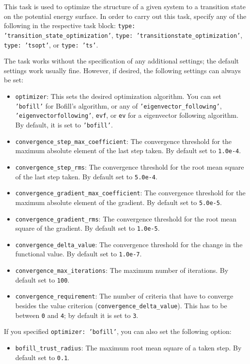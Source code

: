 \documentclass[]{tufte-book}
\begin{document}
This task is used to optimize the structure of a given system to a transition state on the potential energy surface. In 
order to carry out this task, specify any of the following in the respective task block: \texttt{type: 'transition\_state\_optimization'}, 
\texttt{type: 'transitionstate\_optimization'}, \texttt{type: 'tsopt'}, or \texttt{type: 'ts'}.

The task works without the specification of any additional settings; the default settings work usually fine. However,
if desired, the following settings can always be set:
\begin{itemize}
\item \texttt{optimizer}: This sets the desired optimization algorithm. You can set \texttt{'bofill'} for Bofill's algorithm\cite{bofill1, bofill2},
or any of \texttt{'eigenvector\_following'}, \texttt{'eigenvectorfollowing'}, \texttt{evf}, or \texttt{ev} for a 
eigenvector following algorithm. By default, it is set to \texttt{'bofill'}.
\item \texttt{convergence\_step\_max\_coefficient}: The convergence threshold for the maximum absolute element of the last step taken.
By default set to \texttt{1.0e-4}.
\item \texttt{convergence\_step\_rms}: The convergence threshold for the root mean square of the last step taken. By default set to 
\texttt{5.0e-4}.
\item \texttt{convergence\_gradient\_max\_coefficient}: The convergence threshold for the maximum absolute element of the gradient. 
By default set to \texttt{5.0e-5}.
\item \texttt{convergence\_gradient\_rms}: The convergence threshold for the root mean square of the gradient. By default set to 
\texttt{1.0e-5}.
\item \texttt{convergence\_delta\_value}: The convergence threshold for the change in the functional value. By default set to
\texttt{1.0e-7}.
\item \texttt{convergence\_max\_iterations}: The maximum number of iterations. By default set to \texttt{100}.
\item \texttt{convergence\_requirement}: The number of criteria that have to converge besides the value criterion 
(\texttt{convergence\_delta\_value}). This has to be between \texttt{0} and \texttt{4}; by default it is set to \texttt{3}.
\end{itemize}

If you specified \texttt{optimizer: 'bofill'}, you can also set the following option:
\begin{itemize}
\item \texttt{bofill\_trust\_radius}: The maximum root mean square of a taken step. By default set to \texttt{0.1}.
\end{itemize}
\end{document}
